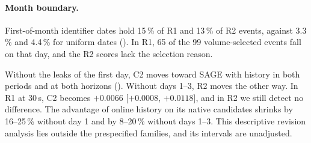 \paragraph{Month boundary.}
First-of-month identifier dates hold 15\,\% of R1 and 13\,\% of R2 events, against 3.3\,\% and 4.4\,\% for uniform dates ().
In R1, 65 of the 99 volume-selected events fall on that day, and the R2 scores lack the selection reason.

Without the leaks of the first day, C2 moves toward SAGE with history in both periods and at both horizons ().
Without days 1--3, R2 moves the other way.
In R1 at 30\,s, C2 becomes $+0.0066$ [$+0.0008$, $+0.0118$], and in R2 we still detect no difference.
The advantage of online history on its native candidates shrinks by 16--25\,\% without day 1 and by 8--20\,\% without days 1--3.
This descriptive revision analysis lies outside the prespecified families, and its intervals are unadjusted.

